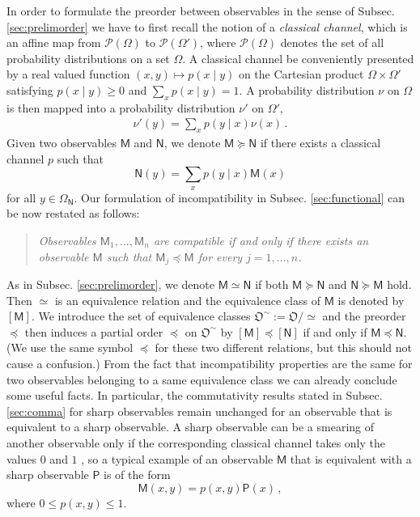 \documentclass[12pt]{iopart}
\theoremstyle{definition}
\newcommand{\Mo}{\mathsf{M}}%
\newcommand{\No}{\mathsf{N}}%
\newcommand{\Po}{\mathsf{P}}%
\newcommand{\pleq}{\preceq}
\newcommand{\pgeq}{\succeq}
\newcommand{\obs}{\mathfrak{O}}
\begin{document}
{ In order to formulate the preorder between observables in the sense of Subsec. \ref{sec:prelimorder}
we have to first recall the notion of a \emph{classical channel}, which is an affine map from $\mathcal{P}(\Omega)$ to $\mathcal{P}(\Omega')$, where $\mathcal{P}(\Omega)$ denotes
the set of all probability distributions on a set $\Omega$. 
A classical channel be conveniently presented by a real valued function $(x,y) \mapsto p(x \mid y)$ on the Cartesian product $\Omega \times \Omega'$ satisfying $p(x \mid y) \geq 0$ and $\sum_x p(x \mid y) = 1$.
A probability distribution $\nu$ on $\Omega$ is then mapped into a probability distribution $\nu'$ on $\Omega'$,
\begin{align}
\nu'(y) = \sum_x p(y \mid x) \nu(x) \, .
\end{align}
Given two observables $\Mo$ and $\No$, we denote $\Mo\pgeq\No$ if there exists a classical channel $p$ such that
\begin{equation}\label{eq:smearing}
\No(y)=\sum_x p(y \mid x) \Mo(x) 
\end{equation}
for all $y\in\Omega_{\No}$.
Our formulation of incompatibility in Subsec. \ref{sec:functional} can be now restated as follows:
\begin{quote}
\emph{
Observables $\Mo_1,\ldots,\Mo_n$ are compatible if and only if 
there exists an observable $\Mo$ such that $\Mo_j\pleq \Mo$ for every $j=1,\ldots,n$.}
\end{quote}

As in Subsec. \ref{sec:prelimorder}, we denote $\Mo\simeq \No$ if both $\Mo \pgeq \No$ and $\No\pgeq \Mo$ hold. 
Then $\simeq$ is an equivalence relation and the equivalence class of $\Mo$ is denoted by $[\Mo]$. 
We introduce the set of equivalence classes $\obs^\sim := \obs / \simeq$ and the preorder $\pleq$ then induces a partial order
 $\pleq$ on $\obs^\sim$  by $[\Mo] \pleq [\No]$ if and only if $\Mo \pleq \No$. 
(We use the same symbol $\pleq$ for these two different relations, but this should not cause a confusion.)
From the fact that incompatibility properties are the same for two observables belonging to a same equivalence class we can already conclude some useful facts.
In particular, the commutativity results stated in Subsec. \ref{sec:comma} for sharp observables remain unchanged for an observable that is equivalent to a sharp observable. 
A sharp observable can be a smearing of another observable only if the corresponding classical channel takes only the values $0$ and $1$ \cite{JePu07}, so a typical example of an observable $\Mo$ that is equivalent with a sharp observable $\Po$ is of the form
\begin{equation}
\Mo(x,y)= p(x,y) \Po(x) \, , 
\end{equation}
where $0 \leq p(x,y) \leq 1$. 


}
\end{document}
